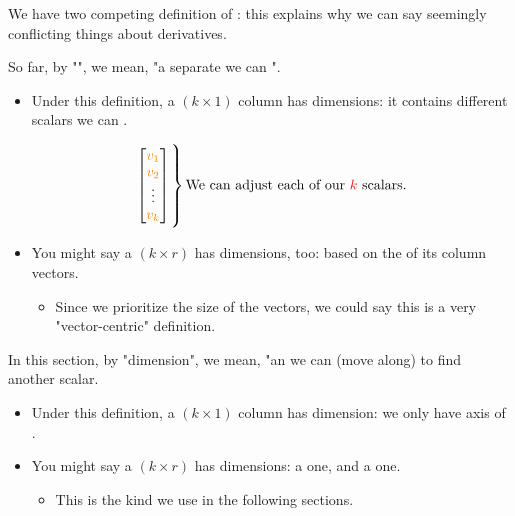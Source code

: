         \begin{clarification}
            We have two competing definition of : this explains why we can say seemingly conflicting things about derivatives.
            
            \boxdiv
            
            So far, by "", we mean, "a separate  we can ".
            
            \begin{itemize}
                \item Under this definition, a $(k \times 1)$ column  has  dimensions: it contains  different scalars we can .
                
                \begin{equation*}
                    \begin{bmatrix}
                        \org{v_1} \\ \org{v_2} \\ \vdots \\ \org{v_k}  
                    \end{bmatrix}
                    \bigggrB{60pt} \text{We can adjust each of our \red{$k$} scalars.}
                \end{equation*}
                
                \item You might say a $(k \times r)$  has  dimensions, too: based on the  of its column vectors.
                    \begin{itemize}
                        \item Since we prioritize the size of the vectors, we could say this is a very "vector-centric" definition.
                    \end{itemize}
            \end{itemize}
            
            \boxdiv
            
            In this section, by "dimension", we mean, "an  we can  (move along) to find another scalar.
            
            \begin{itemize}
                \item Under this definition, a $(k \times 1)$ column  has  dimension: we only have  axis of .
                
                \item You might say a $(k \times r)$  has  dimensions: a  one, and a  one.
                    \begin{itemize}
                        \item This  is the kind we use in the following sections.
                    \end{itemize}
            \end{itemize}
        \end{clarification}

